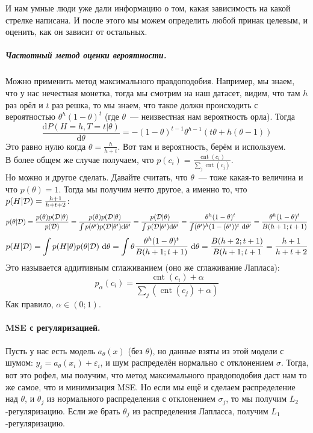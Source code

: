 \documentclass{article}
\begin{document}
    И нам умные люди уже дали информацию о том, какая зависимость на какой стрелке написана. И после этого мы можем определить любой принак целевым, и оценить, как он зависит от остальных.\\
    \subparagraph{Частотный метод оценки вероятности.}
    Можно применить метод максимального правдоподобия. Например, мы знаем, что у нас нечестная монетка, тогда мы смотрим на наш датасет, видим, что там $h$ раз орёл и $t$ раз решка, то мы знаем, что такое должн происходить с вероятностью $\theta^h(1-\theta)^t$ (где $\theta$~--- неизвестная нам вероятность орла). Тогда
    \[
    \frac{\mathrm dP(H=h,T=t|\theta)}{\mathrm d\theta}=-(1-\theta)^{t-1}\theta^{h-1}(t\theta+h(\theta-1))
    \]
    Это равно нулю когда $\theta=\frac h{h+t}$. Вот там и вероятность, берём и используем.\\
    В более общем же случае получаем, что $p(c_i)=\frac{\operatorname{cnt}(c_i)}{\sum_j\operatorname{cnt}(c_j)}$.\\
    Но можно и другое сделать. Давайте считать, что $\theta$~--- тоже какая-то величина и что $p(\theta)=1$. Тогда мы получим нечто другое, а именно то, что $p(H|{\mathcal{D}})=\frac{h+1}{h+t+2}$:
    \[
    p(\theta|{\mathcal{D}})=\frac{p(\theta)p({\mathcal{D}}|\theta)}{p({\mathcal{D}})}=\frac{p(\theta)p({\mathcal{D}}|\theta)}{\int p(\theta')p({\mathcal{D}}|\theta')\mathrm d\theta'}=\frac{p({\mathcal{D}}|\theta)}{\int p({\mathcal{D}}|\theta')\mathrm d\theta'}=\frac{\theta^h(1-\theta)^t}{\int (\theta')^h(1-(\theta'))^t~\mathrm d\theta'}=\frac{\theta^h(1-\theta)^t}{B(h+1;t+1)}
    \]
    \[
    p(H|{\mathcal{D}})=\int p(H|\theta)p(\theta|{\mathcal{D}})~\mathrm d\theta=\int\theta\frac{\theta^h(1-\theta)^t}{B(h+1;t+1)}~\mathrm d\theta=\frac{B(h+2;t+1)}{B(h+1;t+1}=\frac{h+1}{h+t+2}
    \]
    Это называется аддитивным сглаживанием (оно же сглаживание Лапласа):
    \[
    p_\alpha(c_i)=\frac{\operatorname{cnt}(c_i)+\alpha}{\sum_j(\operatorname{cnt}(c_j)+\alpha)}
    \]
    Как правило, $\alpha\in(0;1)$.
    \paragraph{MSE с регуляризацией.}
    Пусть у нас есть модель $a_\theta(x)$ (без $\theta$), но данные взяты из этой модели с шумом: $y_i=a_\theta(x_i)+\varepsilon_i$, и шум распределён нормально с отклонением $\sigma$. Тогда, вот это рофел, мы получим, что метод максимального правдоподобия даст нам то же самое, что и минимизация MSE. Но если мы ещё и сделаем распределение над $\theta$, и $\theta_j$ из нормального распределения с отклонением $\sigma_j$, то мы получим $L_2$-регуляризацию. Если же брать $\theta_j$ из распределения Лапласса, получим $L_1$-регуляризацию.
\end{document}
